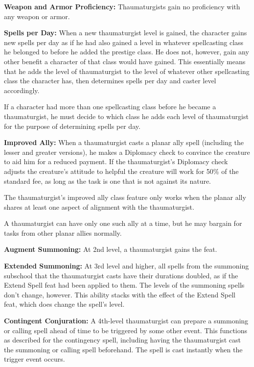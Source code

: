 {
\textbf{Weapon and Armor Proficiency:} Thaumaturgists gain no proficiency with any weapon or armor.

\textbf{Spells per Day:} When a new thaumaturgist level is gained, the character gains new spells per day as if he had also gained a level in whatever spellcasting class he belonged to before he added the prestige class. He does not, however, gain any other benefit a character of that class would have gained. This essentially means that he adds the level of thaumaturgist to the level of whatever other spellcasting class the character has, then determines spells per day and caster level accordingly.

If a character had more than one spellcasting class before he became a thaumaturgist, he must decide to which class he adds each level of thaumaturgist for the purpose of determining spells per day.

\textbf{Improved Ally:} When a thaumaturgist casts a planar ally spell (including the lesser and greater versions), he makes a Diplomacy check to convince the creature to aid him for a reduced payment. If the thaumaturgist’s Diplomacy check adjusts the creature’s attitude to helpful the creature will work for 50\% of the standard fee, as long as the task is one that is not against its nature.

The thaumaturgist’s improved ally class feature only works when the planar ally shares at least one aspect of alignment with the thaumaturgist.

A thaumaturgist can have only one such ally at a time, but he may bargain for tasks from other planar allies normally.

\textbf{Augment Summoning:} At 2nd level, a thaumaturgist gains the  feat.

\textbf{Extended Summoning:} At 3rd level and higher, all spells from the summoning subschool that the thaumaturgist casts have their durations doubled, as if the Extend Spell feat had been applied to them. The levels of the summoning spells don’t change, however. This ability stacks with the effect of the Extend Spell feat, which does change the spell’s level.

\textbf{Contingent Conjuration:} A 4th-level thaumaturgist can prepare a summoning or calling spell ahead of time to be triggered by some other event. This functions as described for the contingency spell, including having the thaumaturgist cast the summoning or calling spell beforehand. The spell is cast instantly when the trigger event occurs.

}
